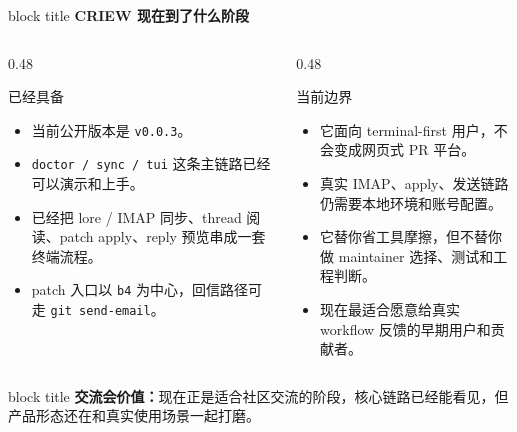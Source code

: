 \documentclass[aspectratio=169,professionalfonts]{beamer}
\newcommand{\sectiontitle}[1]{
  \begin{beamercolorbox}[wd=\linewidth,sep=0.7em,rounded=true]{block title}
    \usebeamerfont*{frametitle}\Large\bfseries #1
  \end{beamercolorbox}
  \vspace{0.4em}
}
\begin{document}
\begin{frame}
  \sectiontitle{CRIEW 现在到了什么阶段}
  \scriptsize
  \begin{columns}[T,totalwidth=\textwidth]
    \begin{column}{0.48\textwidth}
      \begin{exampleblock}{已经具备}
        \begin{itemize}
          \item 当前公开版本是 \texttt{v0.0.3}。
          \item \texttt{doctor / sync / tui} 这条主链路已经可以演示和上手。
          \item 已经把 lore / IMAP 同步、thread 阅读、patch apply、reply 预览串成一套终端流程。
          \item patch 入口以 \texttt{b4} 为中心，回信路径可走 \texttt{git send-email}。
        \end{itemize}
      \end{exampleblock}
    \end{column}
    \begin{column}{0.48\textwidth}
      \begin{alertblock}{当前边界}
        \begin{itemize}
          \item 它面向 terminal-first 用户，不会变成网页式 PR 平台。
          \item 真实 IMAP、apply、发送链路仍需要本地环境和账号配置。
          \item 它替你省工具摩擦，但不替你做 maintainer 选择、测试和工程判断。
          \item 现在最适合愿意给真实 workflow 反馈的早期用户和贡献者。
        \end{itemize}
      \end{alertblock}
    \end{column}
  \end{columns}
  \vspace{0.25em}
  \begin{beamercolorbox}[wd=\linewidth,sep=0.55em,rounded=true]{block title}
    \textbf{交流会价值：}现在正是适合社区交流的阶段，核心链路已经能看见，但产品形态还在和真实使用场景一起打磨。
  \end{beamercolorbox}
\end{frame}
\end{document}
